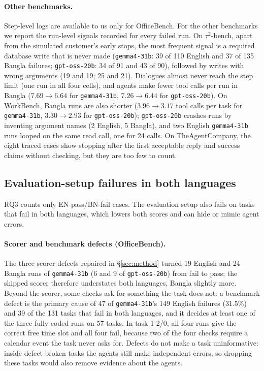 \documentclass[11pt]{article}
\newcommand{\gemma}{\texttt{gemma4-31b}}
\newcommand{\gptoss}{\texttt{gpt-oss-20b}}
\newcommand{\OB}{OfficeBench}
\newcommand{\WB}{WorkBench}
\newcommand{\TAU}{$\tau^2$-bench}
\newcommand{\TAC}{TheAgentCompany}
\begin{document}
\paragraph{Other benchmarks.} Step-level logs are available to us only for \OB{}. For the other
benchmarks we report the run-level signals recorded for every failed run. On \TAU{}, apart from the
simulated customer's early stops, the most frequent signal is a required database write that is
never made (\gemma{}: 39 of 110 English and 37 of 135 Bangla failures; \gptoss{}: 34 of 91 and 43
of 90), followed by writes with wrong arguments (19 and 19; 25 and 21). Dialogues almost never reach
the step limit (one run in all four cells), and agents make fewer tool calls per run in Bangla
($7.69\to6.64$ for \gemma{}, $7.26\to6.44$ for \gptoss{}). On \WB{}, Bangla runs are also shorter
($3.96\to3.17$ tool calls per task for \gemma{}, $3.30\to2.93$ for \gptoss{}); \gptoss{} crashes
runs by inventing argument names (2 English, 5 Bangla), and two English \gemma{} runs looped on the
same read call, one for 24 calls. On \TAC{}, the eight traced cases show stopping after the first
acceptable reply and success claims without checking, but they are too few to count.

\subsection{Evaluation-setup failures in both languages}
\label{sec:setup}

RQ3 counts only EN-pass/BN-fail cases. The evaluation setup also fails on tasks that fail in
both languages, which lowers both scores and can hide or mimic agent errors.

\paragraph{Scorer and benchmark defects (\OB{}).} The three scorer defects repaired in
\S\ref{sec:method} turned 19 English and 24 Bangla runs of \gemma{} (6 and 9 of \gptoss{}) from fail
to pass; the shipped scorer therefore understates both languages, Bangla slightly more. Beyond the
scorer, some checks ask for something the task does not: a benchmark defect is the primary cause of
47 of \gemma{}'s 149 English failures (31.5\%) and 39 of the 131 tasks that fail in both languages,
and it decides at least one of the three fully coded runs on 57 tasks. In task 1-2/0, all four runs
give the correct free time slot and all four fail, because two of the four checks require a
calendar event the task never asks for. Defects do not make a task uninformative: inside
defect-broken tasks the agents still make independent errors, so dropping these tasks would also
remove evidence about the agents.
\end{document}
